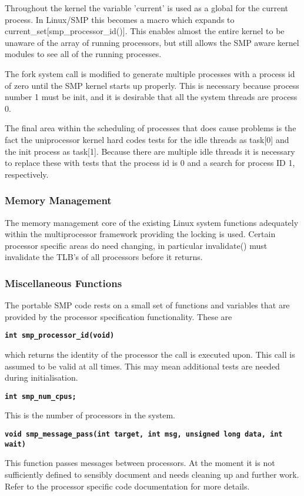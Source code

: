 \documentclass[]{article}
\begin{document}
Throughout the kernel the variable 'current' is used as a global for the 
current process. In Linux/SMP this becomes a macro which expands to 
current\_set[smp\_processor\_id()]. This enables almost the entire kernel to 
be unaware of the array of running processors, but still allows the SMP 
aware kernel modules to see all of the running processes.

The fork system call is modified to generate multiple processes with a 
process id of zero until the SMP kernel starts up properly. This is 
necessary because process number 1 must be init, and it is desirable that 
all the system threads are process 0. 

The final area within the scheduling of processes that does cause problems 
is the fact the uniprocessor kernel hard codes tests for the idle threads 
as task[0] and the init process as task[1]. Because there are multiple idle 
threads it is necessary to replace these with tests that the process id is 
0 and a search for process ID 1, respectively.

\subsubsection{Memory Management}
The memory management core of the existing Linux system functions 
adequately within the multiprocessor framework providing the locking is 
used. Certain processor specific areas do need changing, in particular 
invalidate() must invalidate the TLB's of all processors before it returns.


\subsubsection{Miscellaneous Functions}
The portable SMP code rests on a small set of functions and variables 
that are provided by the processor specification functionality. These are

{\tt \bf int smp\_processor\_id(void) }

which returns the identity of the processor the call is executed upon. This 
call is assumed to be valid at all times. This may mean additional tests 
are needed during initialisation.


{\tt \bf int smp\_num\_cpus;}

This is the number of processors in the system. \

{\tt \bf void smp\_message\_pass(int target, int msg, unsigned long data,
		int wait)}

This function passes messages between processors. At the moment it is not 
sufficiently defined to sensibly document and needs cleaning up and further 
work. Refer to the processor specific code documentation for more details.
\end{document}
